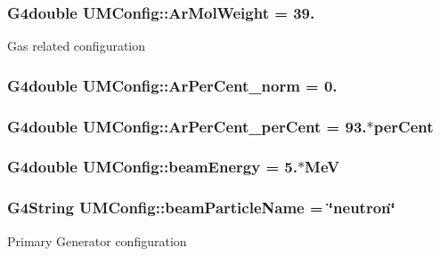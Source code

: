 \subsubsection[{Ar\+Mol\+Weight}]{\setlength{\rightskip}{0pt plus 5cm}G4double U\+M\+Config\+::\+Ar\+Mol\+Weight = 39.}\label{structUMConfig_a31dc39c8cb1cfdbaa648723dcd04a583}
Gas related configuration \hypertarget{structUMConfig_aee77ef4ee8c82ef9749ba952a4956076}{}
\subsubsection[{Ar\+Per\+Cent\+\_\+norm}]{\setlength{\rightskip}{0pt plus 5cm}G4double U\+M\+Config\+::\+Ar\+Per\+Cent\+\_\+norm = 0.}\label{structUMConfig_aee77ef4ee8c82ef9749ba952a4956076}
\hypertarget{structUMConfig_a0619ce16f7b8ea36806bfd25139c8a61}{}
\subsubsection[{Ar\+Per\+Cent\+\_\+per\+Cent}]{\setlength{\rightskip}{0pt plus 5cm}G4double U\+M\+Config\+::\+Ar\+Per\+Cent\+\_\+per\+Cent = 93.$\ast$per\+Cent}\label{structUMConfig_a0619ce16f7b8ea36806bfd25139c8a61}
\hypertarget{structUMConfig_ab02e67f7b40f3fab43e16420dc9ed66a}{}
\subsubsection[{beam\+Energy}]{\setlength{\rightskip}{0pt plus 5cm}G4double U\+M\+Config\+::beam\+Energy = 5.$\ast$Me\+V}\label{structUMConfig_ab02e67f7b40f3fab43e16420dc9ed66a}
\hypertarget{structUMConfig_a74976964c0a3c1e31a73fd823e05bcb1}{}
\subsubsection[{beam\+Particle\+Name}]{\setlength{\rightskip}{0pt plus 5cm}G4\+String U\+M\+Config\+::beam\+Particle\+Name = \char`\"{}neutron\char`\"{}}\label{structUMConfig_a74976964c0a3c1e31a73fd823e05bcb1}
Primary Generator configuration \hypertarget{structUMConfig_ab4b67f65c87ddd62e28b0d49f407be31}{}
